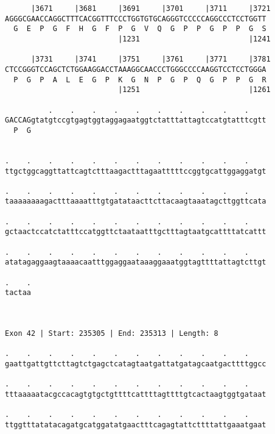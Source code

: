 \documentclass{article}
\begin{document}
\begin{Verbatim}
      |3671     |3681     |3691     |3701     |3711     |3721
AGGGCGAACCAGGCTTTCACGGTTTCCCTGGTGTGCAGGGTCCCCCAGGCCCTCCTGGTT
  G  E  P  G  F  H  G  F  P  G  V  Q  G  P  P  G  P  P  G  S
                          |1231                         |1241
  
      |3731     |3741     |3751     |3761     |3771     |3781
CTCCGGGTCCAGCTCTGGAAGGACCTAAAGGCAACCCTGGGCCCCAAGGTCCTCCTGGGA
  P  G  P  A  L  E  G  P  K  G  N  P  G  P  Q  G  P  P  G  R
                          |1251                         |1261
  
          .    .    .    .    .    .    .    .    .    .    
GACCAGgtatgtccgtgagtggtaggagaatggtctatttattagtccatgtatttcgtt
  P  G                                                      
                                                            
  
.    .    .    .    .    .    .    .    .    .    .    .    
ttgctggcaggttattcagtctttaagactttagaatttttccggtgcattggaggatgt
                                                            
.    .    .    .    .    .    .    .    .    .    .    .    
taaaaaaaagactttaaaatttgtgatataacttcttacaagtaaatagcttggttcata
                                                            
.    .    .    .    .    .    .    .    .    .    .    .    
gctaactccatctatttccatggttctaataatttgctttagtaatgcattttatcattt
                                                            
.    .    .    .    .    .    .    .    .    .    .    .    
atatagaggaagtaaaacaatttggaggaataaaggaaatggtagttttattagtcttgt
                                                            
.    .
tactaa
      
      
 
Exon 42 | Start: 235305 | End: 235313 | Length: 8
 
.    .    .    .    .    .    .    .    .    .    .    .    
gaattgattgttcttagtctgagctcatagtaatgattatgatagcaatgacttttggcc
                                                            
.    .    .    .    .    .    .    .    .    .    .    .    
tttaaaaatacgccacagtgtgctgttttcattttagttttgtcactaagtggtgataat
                                                            
.    .    .    .    .    .    .    .    .    .    .    .    
ttggtttatatacagatgcatggatatgaactttcagagtattcttttattgaaatgaat
                                                            

\end{Verbatim}
\end{document}
